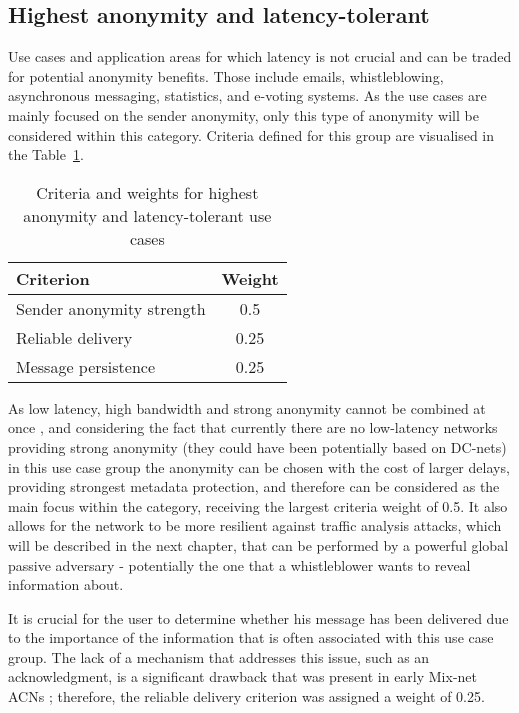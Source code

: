 \subsection{Highest anonymity and latency-tolerant}
Use cases and application areas for which latency is not crucial and can be traded for potential anonymity benefits. Those include emails, whistleblowing, asynchronous messaging, statistics, and e-voting systems.
As the use cases are mainly focused on the sender anonymity, only this type of anonymity will be considered within this category.
Criteria defined for this group are visualised in the Table~\ref{tab:high_anonymity_criteria}.

\begin{table}[!ht]
\centering
\caption{Criteria and weights for highest anonymity and latency-tolerant use cases}
\begin{tabular}{|l|c|}
\hline
\textbf{Criterion} & \textbf{Weight} \\
\hline
Sender anonymity strength & 0.5 \\
Reliable delivery & 0.25 \\
Message persistence & 0.25 \\
\hline
\end{tabular}
\label{tab:high_anonymity_criteria}
\end{table}


As low latency, high bandwidth and strong anonymity cannot be combined at once \cite{anonymity-trillema}, and considering the fact that currently there are no low-latency networks providing strong anonymity (they could have been potentially based on DC-nets) in this use case group the anonymity can be chosen with the cost of larger delays, providing strongest metadata protection, and therefore can be considered as the main focus within the category, receiving the largest criteria weight of 0.5. It also allows for the network to be more resilient against traffic analysis attacks, which will be described in the next chapter, that can be performed by a powerful global passive adversary - potentially the one that a whistleblower wants to reveal information about.

It is crucial for the user to determine whether his message has been delivered due to the importance of the information that is often associated with this use case group. The lack of a mechanism that addresses this issue, such as an acknowledgment, is a significant drawback that was present in early Mix-net ACNs \cite{mix-net-reliability}; therefore, the reliable delivery criterion was assigned a weight of 0.25.

